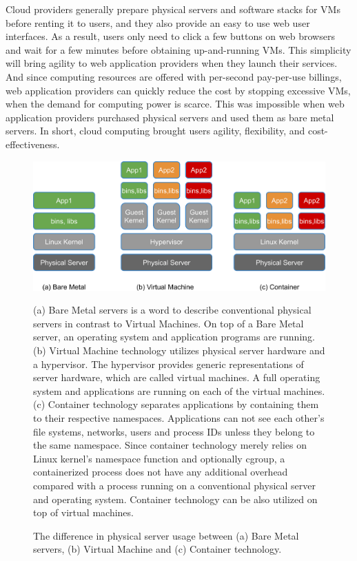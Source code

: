 Cloud providers generally prepare physical servers and software stacks for VMs before renting it to users, and they also provide an easy to use web user interfaces.
As a result, users only need to click a few buttons on web browsers and wait for a few minutes before obtaining up-and-running VMs.
This simplicity will bring agility to web application providers when they launch their services.
And since computing resources are offered with per-second pay-per-use billings, web application providers can quickly reduce the cost by stopping excessive VMs, when the demand for computing power is scarce.
This was impossible when web application providers purchased physical servers and used them as bare metal servers.
In short, cloud computing brought users agility, flexibility, and cost-effectiveness.

\begin{figure}[h]
\begin{center}
\includegraphics[width=0.8\columnwidth]{Figs/physical_vm_container.png}
\end{center}
\captionsetup{margin=1cm}
\caption{
The difference in physical server usage between (a) Bare Metal servers, (b) Virtual Machine and (c) Container technology.
}

\centering\parbox[c]{0.9\columnwidth}{
(a) Bare Metal servers is a word to describe conventional physical servers in contrast to Virtual Machines.
On top of a Bare Metal server, an operating system and application programs are running.
(b) Virtual Machine technology utilizes physical server hardware and a hypervisor.
The hypervisor provides generic representations of server hardware, which are called virtual machines.
A full operating system and applications are running on each of the virtual machines.
(c) Container technology separates applications by containing them to their respective namespaces.
Applications can not see each other's file systems, networks, users and process IDs unless they belong to the same namespace.
Since container technology merely relies on Linux kernel's namespace function and optionally cgroup, a containerized process does not have any additional overhead compared with a process running on a conventional physical server and operating system.
Container technology can be also utilized on top of virtual machines.
}
\label{fig:physical_vm_container}
\end{figure}

